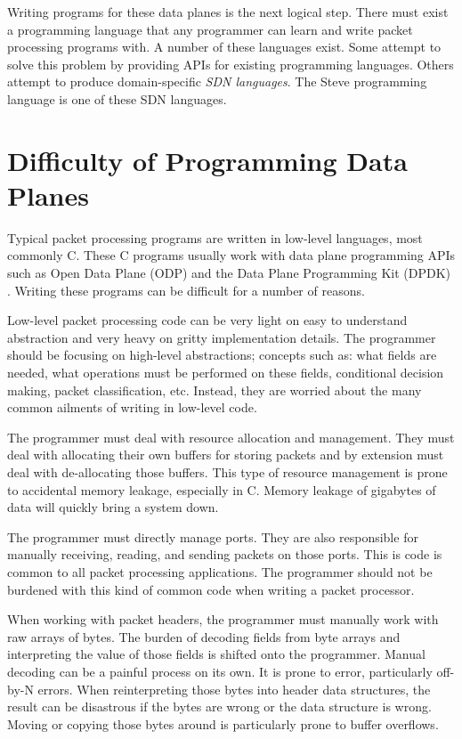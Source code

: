 Writing programs for these data planes is the next logical step. There must
exist a programming language that any programmer can learn and write packet
processing programs with. A number of these languages exist. Some attempt to
solve this problem by providing APIs for existing programming languages. Others
attempt to produce domain-specific \textit{SDN languages}. The Steve programming
language is one of these SDN languages.

\section{Difficulty of Programming Data Planes}

Typical packet processing programs are written in low-level languages, most
commonly C. These C programs usually work with data plane programming APIs such
as Open Data Plane (ODP) \cite{odp_webpage} and the Data Plane Programming Kit
(DPDK) \cite{dpdk_webpage}. Writing these programs can be difficult for a number
of reasons.

Low-level packet processing code can be very light on easy to understand
abstraction and very heavy on gritty implementation details. The programmer
should be focusing on high-level abstractions; concepts such as: what fields are
needed, what operations must be performed on these fields, conditional decision
making, packet classification, etc. Instead, they are worried about the many
common ailments of writing in low-level code.

The programmer must deal with resource allocation and management. They must deal
with allocating their own buffers for storing packets and by extension must deal
with de-allocating those buffers. This type of resource management is prone to
accidental memory leakage, especially in C. Memory leakage of gigabytes of data
will quickly bring a system down.

The programmer must directly manage ports. They are also responsible for
manually receiving, reading, and sending packets on those ports. This is code is
common to all packet processing applications. The programmer should not be
burdened with this kind of common code when writing a packet processor.

When working with packet headers, the programmer must manually work with raw
arrays of bytes. The burden of decoding fields from byte arrays and interpreting
the value of those fields is shifted onto the programmer. Manual decoding can be
a painful process on its own. It is prone to error, particularly off-by-N
errors. When reinterpreting those bytes into header data structures, the result
can be disastrous if the bytes are wrong or the data structure is wrong. Moving
or copying those bytes around is particularly prone to buffer overflows.


